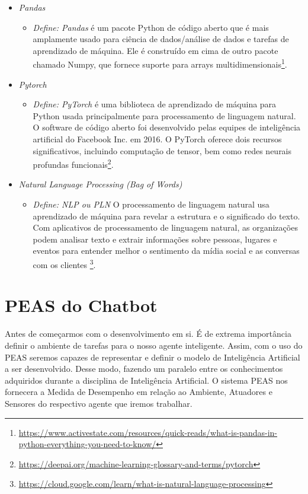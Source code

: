 \begin{itemize}
   \item \textit{Pandas}
         \begin{itemize}
            \item \textit{Define: Pandas} é um pacote Python de código aberto que é mais amplamente usado para ciência de dados/análise de dados e tarefas de aprendizado de máquina. Ele é construído em cima de outro pacote chamado Numpy, que fornece suporte para arrays multidimensionais\footnote{\url{https://www.activestate.com/resources/quick-reads/what-is-pandas-in-python-everything-you-need-to-know/}}.
         \end{itemize}

   \item \textit{Pytorch}
         \begin{itemize}
            \item \textit{Define: PyTorch} é uma biblioteca de aprendizado de máquina para Python usada principalmente para processamento de linguagem natural. O software de código aberto foi desenvolvido pelas equipes de inteligência artificial do Facebook Inc. em 2016. O PyTorch oferece dois recursos significativos, incluindo computação de tensor, bem como redes neurais profundas funcionais\footnote{\url{https://deepai.org/machine-learning-glossary-and-terms/pytorch}}.
         \end{itemize}

   \item \textit{Natural Language Processing (Bag of Words)}
         \begin{itemize}
            \item \textit{Define: NLP ou PLN }O processamento de linguagem natural usa aprendizado de máquina para revelar a estrutura e o significado do texto. Com aplicativos de processamento de linguagem natural, as organizações podem analisar texto e extrair informações sobre pessoas, lugares e eventos para entender melhor o sentimento da mídia social e as conversas com os clientes \footnote{\url{https://cloud.google.com/learn/what-is-natural-language-processing}}.
         \end{itemize}


\end{itemize}

\section[PEAS do Chatbot]{PEAS do Chatbot}

Antes de começarmos com o desenvolvimento em si. É de extrema importância definir o ambiente de tarefas para o nosso agente inteligente. Assim, com o uso do PEAS seremos capazes de representar e definir o modelo de Inteligência Artificial a ser desenvolvido. Desse modo, fazendo um
paralelo entre os conhecimentos adquiridos durante a disciplina de Inteligência Artificial.
O sistema PEAS nos fornecera a Medida de Desempenho em relação ao Ambiente, Atuadores e Sensores do respectivo agente que iremos trabalhar.

